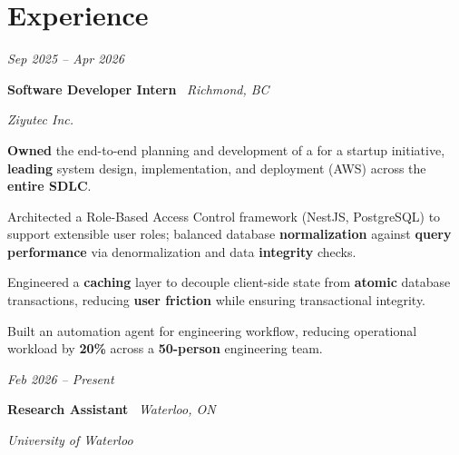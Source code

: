 \section{Experience}

    \begin{twocolentry}{

    \textit{Sep 2025 -- Apr 2026}}
        \textbf{Software Developer Intern} \textbar\ \textit{Richmond, BC}
        
        \textit{Ziyutec Inc.}
    \end{twocolentry}

    \vspace{0.10 cm}
    \begin{onecolentry}
        \begin{highlights}
    
    \item \textbf{Owned} the end-to-end planning and development of a  for a startup initiative, \textbf{leading} system design, implementation, and deployment (AWS) across the \textbf{entire SDLC}.

    \item Architected a Role-Based Access Control framework (NestJS, PostgreSQL) to support extensible user roles; balanced database \textbf{normalization} against \textbf{query performance} via denormalization and data \textbf{integrity} checks.

    \item Engineered a \textbf{caching} layer to decouple client-side state from \textbf{atomic} database transactions, reducing \textbf{user friction} while ensuring transactional integrity.

    \item Built an automation agent for engineering workflow, reducing operational workload by \textbf{20\%} across a \textbf{50-person} engineering team.

        
        \end{highlights}
    \end{onecolentry}
\vspace{0.2cm}    \begin{twocolentry}{

    \textit{Feb 2026 -- Present}}
        \textbf{Research Assistant} \textbar\ \textit{Waterloo, ON}
        
        \textit{University of Waterloo}
    \end{twocolentry}

